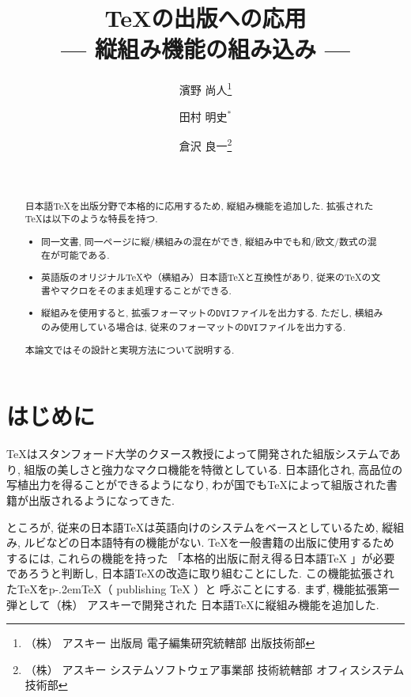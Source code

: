 ﻿


\title{\TeX の出版への応用\\
	\large--- 縦組み機能の組み込み ---}
\author{濱野 尚人\thanks{（株）\kern-2pt アスキー %
		出版局 電子編集研究統轄部 出版技術部}
	\and 田村 明史${}^*$
	\and 倉沢 良一\thanks{（株）\kern-2pt アスキー %
		システムソフトウェア事業部 技術統轄部 オフィスシステム技術部}}
\date{\ }

\setlength{\unitlength}{0.1in}

\def\angle#1{$\langle{}$#1${}\rangle$}
\def\pTeX{p\kern-.2em\TeX}



\maketitle \thispagestyle{empty}

\begin{abstract}
日本語\TeX を出版分野で本格的に応用するため, 縦組み機能を追加した.
拡張された\TeX は以下のような特長を持つ.
\begin{itemize}
\item 同一文書, 同一ページに縦/横組みの混在ができ,
	縦組み中でも和/欧文/数式の混在が可能である.
\item 英語版のオリジナル\TeX や（横組み）日本語\TeX と互換性があり,
	従来の\TeX の文書やマクロをそのまま処理することができる.
\item 縦組みを使用すると, 拡張フォーマットの{\tt DVI}ファイルを出力する.
	ただし, 横組みのみ使用している場合は,
	従来のフォーマットの{\tt DVI}ファイルを出力する.
\end{itemize}
本論文ではその設計と実現方法について説明する.
\end{abstract}



\section{はじめに}

\TeX はスタンフォード大学のクヌース教授によって開発された組版システムであり,
組版の美しさと強力なマクロ機能を特徴としている.
日本語化され\cite{jtex}, 高品位の写植出力を得ることができるようになり,
わが国でも\TeX によって組版された書籍が出版されるようになってきた.

ところが, 従来の日本語\TeX は英語向けのシステムをベースとしているため,
縦組み, ルビなどの日本語特有の機能がない.
\TeX を一般書籍の出版に使用するためするには, これらの機能を持った
「本格的出版に耐え得る日本語\TeX\kern0pt 」が必要であろうと判断し,
日本語\TeX の改造に取り組むことにした.
この機能拡張された\TeX を\pTeX （\kern0pt publishing \TeX\kern0pt ）と
呼ぶことにする.
まず, 機能拡張第一弾として（株）\kern-3pt アスキーで開発された
日本語\TeX に縦組み機能を追加した.

